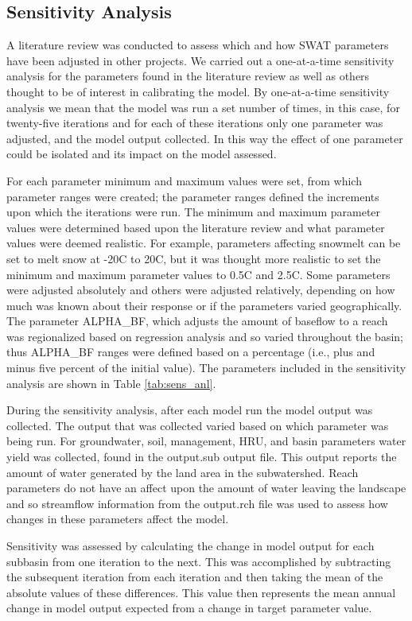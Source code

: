 \subsection{Sensitivity Analysis}
A literature review was conducted to assess which and how SWAT parameters have
been adjusted in other projects. We carried out a one-at-a-time sensitivity
analysis for the parameters found in the literature review as well as others
thought to be of interest in calibrating the model. By one-at-a-time sensitivity analysis
we mean that the model was run a set number of times, in this case, for
twenty-five iterations and for each of these iterations only one parameter was
adjusted, and the model output collected. In this way the effect of one
parameter could be isolated and its impact on the model assessed.

For each parameter minimum and maximum values were set, from which parameter
ranges were created; the parameter ranges defined the increments upon which the
iterations were run. The minimum and maximum parameter values were determined
based upon the literature review and what parameter values were deemed
realistic. For example, parameters affecting snowmelt can be set to melt snow at
-20\degree C  to 20\degree C, but it was thought more realistic to set the
minimum and maximum parameter values to 0.5\degree C  and 2.5\degree C. Some
parameters were adjusted absolutely and others were adjusted relatively,
depending on how much was known about their response or if the parameters varied
geographically. The parameter ALPHA\_BF, which adjusts the amount of baseflow to
a reach was regionalized based on regression analysis and so varied throughout
the basin; thus ALPHA\_BF ranges were defined based on a percentage (i.e., plus
and minus five percent of the initial value). The parameters included in the
sensitivity analysis are shown in Table \ref{tab:sens_anl}.

During the sensitivity analysis, after each model run the model output was
collected. The output that was collected varied based on which parameter was
being run. For groundwater, soil, management, HRU, and basin parameters water
yield was collected, found in the output.sub output file. This output reports
the amount of water generated by the land area in the subwatershed. Reach
parameters do not have an affect upon the amount of water leaving the landscape
and so streamflow information from the output.rch file was used to assess how
changes in these parameters affect the model.
	
Sensitivity was assessed by calculating the change in model output for each
subbasin from one iteration to the next. This was accomplished by subtracting
the subsequent iteration from each iteration and then taking the mean of the
absolute values of these differences. This value then represents the mean annual
change in model output expected from a change in target parameter value.


\pagebreak